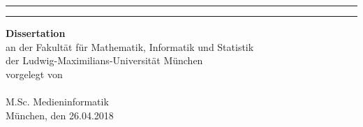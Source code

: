 \documentclass[12pt,a4paper,twoside]{book}
\begin{document}
{\begin{minipage}{188mm}
		
		\begin{center}
			\vspace*{20mm}
			\rule{\textwidth}{0.5pt}
			\vskip 5mm
			\fontsize{28}{34}\rmfamily\scshape\mytitle
			\par
			\rule{\textwidth}{0.5pt}
			\vskip 20mm
			\huge \textbf{Dissertation}\\ 
			\vspace*{5mm}
			\normalfont\Large an der Fakultät für Mathematik, Informatik und Statistik\\
			der Ludwig-Maximilians-Universität München\\
			\vspace*{10mm}
			vorgelegt von\\
			\vspace*{10mm}
			{\huge\scshape\textbf{\myname}}\\
			\vspace*{2mm}
			M.Sc. Medieninformatik\\ 
			\vspace*{20mm}
			\normalfont\Large München, den 26.04.2018 
		\end{center}
	\end{minipage}
	
	\clearpage
	
}

\pagestyle{fancy}%
\restoregeometry
\end{document}

